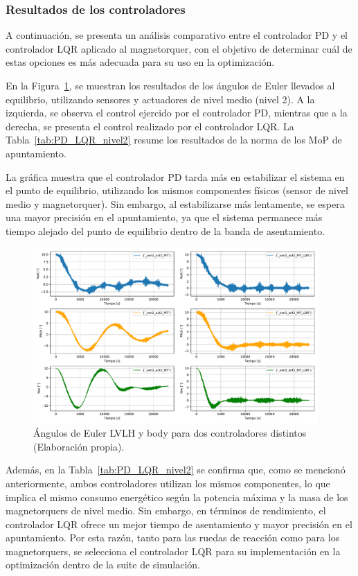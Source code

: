 \subsubsection{Resultados de los controladores}

A continuación, se presenta un análisis comparativo entre el controlador PD y el controlador LQR aplicado al magnetorquer, con el objetivo de determinar cuál de estas opciones es más adecuada para su uso en la optimización.

En la Figura~\ref{fig:PD_LQR_nivel2}, se muestran los resultados de los ángulos de Euler llevados al equilibrio, utilizando sensores y actuadores de nivel medio (nivel 2). A la izquierda, se observa el control ejercido por el controlador PD, mientras que a la derecha, se presenta el control realizado por el controlador LQR. La Tabla~\ref{tab:PD_LQR_nivel2} resume los resultados de la norma de los MoP de apuntamiento.

La gráfica muestra que el controlador PD tarda más en estabilizar el sistema en el punto de equilibrio, utilizando los mismos componentes físicos (sensor de nivel medio y magnetorquer). Sin embargo, al estabilizarse más lentamente, se espera una mayor precisión en el apuntamiento, ya que el sistema permanece más tiempo alejado del punto de equilibrio dentro de la banda de asentamiento.

\begin{figure}[H]
	\centering    
	\includegraphics[width=0.97\textwidth]{PD_LQR_nivel2.pdf}
	\caption{Ángulos de Euler LVLH y body para dos controladores distintos (Elaboración propia).}
	\label{fig:PD_LQR_nivel2}
\end{figure}

Además, en la Tabla~\ref{tab:PD_LQR_nivel2} se confirma que, como se mencionó anteriormente, ambos controladores utilizan los mismos componentes, lo que implica el mismo consumo energético según la potencia máxima y la masa de los magnetorquers de nivel medio. Sin embargo, en términos de rendimiento, el controlador LQR ofrece un mejor tiempo de asentamiento y mayor precisión en el apuntamiento. Por esta razón, tanto para las ruedas de reacción como para los magnetorquers, se selecciona el controlador LQR para su implementación en la optimización dentro de la suite de simulación.

